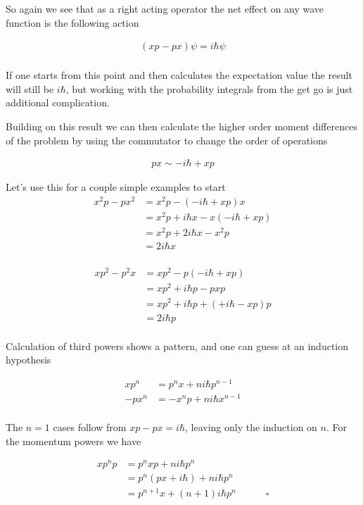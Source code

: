 So again we see that as a right acting operator the net effect on any wave function is the following action

\begin{align*}
(x p - p x) \psi = i \hbar \psi \\
\end{align*}

If one starts from this point and then calculates the expectation value the result will still be $i \hbar$, but working
with the probability integrals from the get go is just additional complication.

Building on this result we can then calculate the higher order moment differences of the problem by using the commutator
to change the order of operations

\begin{align*}
p x \sim -i \hbar + x p
\end{align*}

Let's use this for a couple simple examples to start
\begin{align*}
x^2 p - p x^2
&=
x^2 p - ( -i \hbar + x p) x \\
&=
x^2 p + i \hbar x - x ( -i \hbar + x p) \\
&=
x^2 p + 2 i \hbar x - x^2 p \\
&=
2 i \hbar x \\
\end{align*}

\begin{align*}
x p^2 - p^2 x
&=
x p^2 - p ( -i \hbar + x p) \\
&=
x p^2 + i \hbar p - p x p \\
&=
x p^2 + i \hbar p + ( +i \hbar - x p) p \\
&=
2 i \hbar p \\
\end{align*}

Calculation of third powers shows a pattern, and one can guess at an induction hypothesis

\begin{align*}
x p^n &= p^n x + n i \hbar p^{n-1} \\
-p x^n &= -x^n p + n i \hbar x^{n-1} \\
\end{align*}

The $n=1$ cases follow from $xp - px = i\hbar$, leaving only the induction on $n$.  For the momentum powers we have

\begin{align*}
x p^n p 
&= p^n x p + n i \hbar p^{n} \\
&= p^n (p x + i \hbar) + n i \hbar p^{n} \\
&= p^{n+1} x + (n+1) i \hbar p^{n} \quad\quad\quad\square \\
\end{align*}

